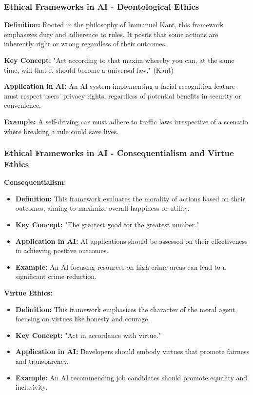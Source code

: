 \documentclass[aspectratio=169]{beamer}
\begin{document}
\begin{frame}[fragile]
    \frametitle{Ethical Frameworks in AI - Deontological Ethics}
    \textbf{Definition:} Rooted in the philosophy of Immanuel Kant, this framework emphasizes duty and adherence to rules. It posits that some actions are inherently right or wrong regardless of their outcomes. 
    
    \textbf{Key Concept:} 
    "Act according to that maxim whereby you can, at the same time, will that it should become a universal law." (Kant)
    
    \textbf{Application in AI:} 
    An AI system implementing a facial recognition feature must respect users' privacy rights, regardless of potential benefits in security or convenience.
    
    \textbf{Example:} 
    A self-driving car must adhere to traffic laws irrespective of a scenario where breaking a rule could save lives.
\end{frame}

\begin{frame}[fragile]
    \frametitle{Ethical Frameworks in AI - Consequentialism and Virtue Ethics}
    \textbf{Consequentialism:}
    \begin{itemize}
        \item \textbf{Definition:} This framework evaluates the morality of actions based on their outcomes, aiming to maximize overall happiness or utility.
        \item \textbf{Key Concept:} "The greatest good for the greatest number."
        \item \textbf{Application in AI:} AI applications should be assessed on their effectiveness in achieving positive outcomes.
        \item \textbf{Example:} An AI focusing resources on high-crime areas can lead to a significant crime reduction.
    \end{itemize}

    \textbf{Virtue Ethics:}
    \begin{itemize}
        \item \textbf{Definition:} This framework emphasizes the character of the moral agent, focusing on virtues like honesty and courage.
        \item \textbf{Key Concept:} "Act in accordance with virtue."
        \item \textbf{Application in AI:} Developers should embody virtues that promote fairness and transparency.
        \item \textbf{Example:} An AI recommending job candidates should promote equality and inclusivity.
    \end{itemize}
\end{frame}
\end{document}
